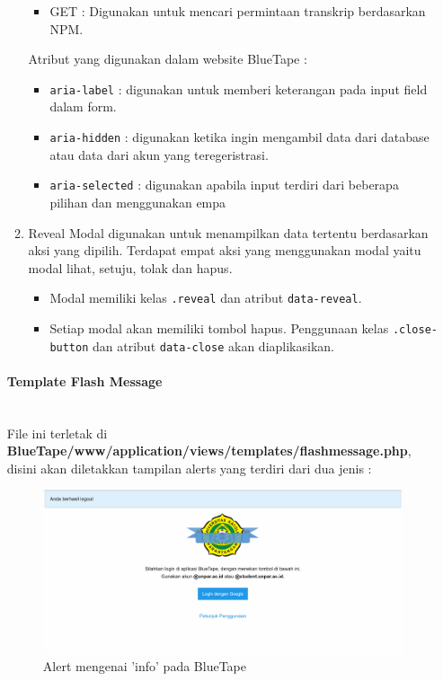 \documentclass[a4paper,twoside]{article}
\newcommand{\myparagraph}[1]{\paragraph{#1}\mbox{}\\}
\begin{document}
\begin{enumerate}
\begin{enumerate}
\begin{itemize}
				\item GET : Digunakan untuk mencari permintaan transkrip berdasarkan NPM.
			\end{itemize}	  
			Atribut yang digunakan dalam website BlueTape : 	
			\begin{itemize}
				\item \colorbox{mygray}{\texttt{aria-label}} : digunakan untuk memberi keterangan pada input field dalam form.
				\item \colorbox{mygray}{\texttt{aria-hidden}} : digunakan ketika ingin mengambil data dari database atau data dari akun yang teregeristrasi.
				\item \colorbox{mygray}{\texttt{aria-selected}} : digunakan apabila input terdiri dari beberapa pilihan dan menggunakan empa
			\end{itemize}	
			\item Reveal
			Modal digunakan untuk menampilkan data tertentu berdasarkan aksi yang dipilih. Terdapat empat aksi yang menggunakan modal yaitu modal lihat, setuju, tolak dan hapus.
			\begin{itemize}
				\item Modal memiliki kelas \colorbox{mygray}{\texttt{.reveal}} dan atribut \colorbox{mygray}{\texttt{data-reveal}}.
				\item Setiap modal akan memiliki tombol hapus. Penggunaan kelas \texttt{.close-button} dan atribut \colorbox{mygray}{\texttt{data-close}} akan diaplikasikan.			
			\end{itemize} 	 
		\end{enumerate}
		\myparagraph{Template Flash Message}
		File ini terletak di \textbf{BlueTape/www/application/views/templates/flashmessage.php}, disini akan diletakkan tampilan alerts yang terdiri dari dua jenis :
		\begin{figure} [H]
			\centering  
			\includegraphics[scale=0.7]{alertInfo_zurb.png}  
			\caption{Alert mengenai 'info' pada BlueTape}	 
		\end{figure}
		

\end{enumerate}
\end{document}

